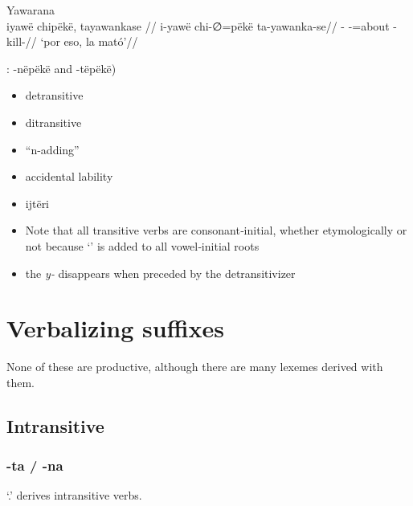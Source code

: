 \documentclass{memoir}
\begin{document}
\pex\label{}    \a Yawarana\\
    \label{convfemgrme-217}        \begingl
        \glpreamble iyawë chipëkë, tayawankase //
        \gla i-yawë chi-∅=pëkë ta-yawanka-se//
        \glb {}- -=about -kill-//
            \glft ‘por eso, la mató’//  
        \endgl 
\xe

: -nëpëkë and -tëpëkë)

\begin{itemize}
\item
  detransitive
\item
  ditransitive
\item
  ``n-adding''
\item
  accidental lability
\item
  ijtëri
\item
  Note that all transitive verbs are consonant‑initial, whether
  etymologically or not because  `' is added to all
  vowel‑initial roots
\item
  the \emph{y‑} disappears when preceded by the detransitivizer
\end{itemize}

\section{\texorpdfstring{Verbalizing suffixes
\label{sec:vbz}}{Verbalizing suffixes }}

None of these are productive, although there are many lexemes derived
with them.

\subsection{Intransitive}

\subsubsection{-ta / -na}

 `.' derives intransitive verbs.
\end{document}
